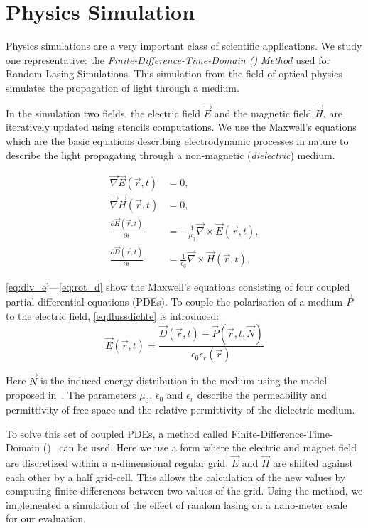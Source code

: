 \section{Physics Simulation}
\label{sec:physicsSim}

Physics simulations are a very important class of scientific applications.
We study one representative: the \emph{Finite-Difference-Time-Domain (\FDTD) Method} used for Random Lasing Simulations.
This simulation from the field of optical physics simulates the propagation of light through a medium.

In the simulation two fields, the electric field $\vec{E}$ and the magnetic field $\vec{H}$, are iteratively updated using stencils computations.
We use the Maxwell's equations which are the basic equations describing electrodynamic processes in nature to describe the light propagating through a non-magnetic (\emph{dielectric}) medium.

\begin{align}
  \vec{\nabla}\vec{E}\left(\vec{r}, t\right) &= 0, \label{eq:div_e}\\
  \vec{\nabla}\vec{H}\left(\vec{r}, t\right) &= 0, \label{eq:div_h}\\
  \frac{\partial\vec{H}\left(\vec{r}, t\right)}{\partial t} &= -\frac{1}{\mu_0}\vec{\nabla} \times \vec{E}\left(\vec{r}, t\right), \label{eq:rot_h}\\
  \frac{\partial\vec{D}\left(\vec{r}, t\right)}{\partial t} &= \frac{1}{\epsilon_0}\vec{\nabla} \times \vec{H}\left(\vec{r}, t\right), \label{eq:rot_d}
\end{align}

\noindent
\autoref{eq:div_e}---\ref{eq:rot_d} show the Maxwell's equations consisting of four coupled partial differential equations (PDEs).
To couple the polarisation of a medium $\vec{P}$ to the electric field, \autoref{eq:flussdichte} is introduced:
\begin{equation}
\vec{E}\left(\vec{r}, t\right) = \frac{\vec{D}\left(\vec{r}, t\right) - \vec{P}\left(\vec{r}, t, \vec{N}\right)}{\epsilon_0\epsilon_r\left(\vec{r}\right)}
\label{eq:flussdichte}
\end{equation}

\noindent
Here $\vec{N}$ is the induced energy distribution in the medium using the model proposed in~\cite{Jiang2000}.
The parameters $\mu_0$, $\epsilon_0$ and $\epsilon_r$ describe the permeability and permittivity of free space and the relative permittivity of the dielectric medium.

To solve this set of coupled PDEs, a method called Finite-Difference-Time-Domain (\FDTD)~\cite{Yee1966} can be used.
Here we use a form where the electric and magnet field are discretized within a n-dimensional regular grid.
$\vec{E}$ and $\vec{H}$ are shifted against each other by a half grid-cell.
This allows the calculation of the new values by computing finite differences between two values of the grid.
Using the \FDTD method, we implemented a simulation of the effect of random lasing on a nano-meter scale~\cite{Cao1999} for our evaluation.

